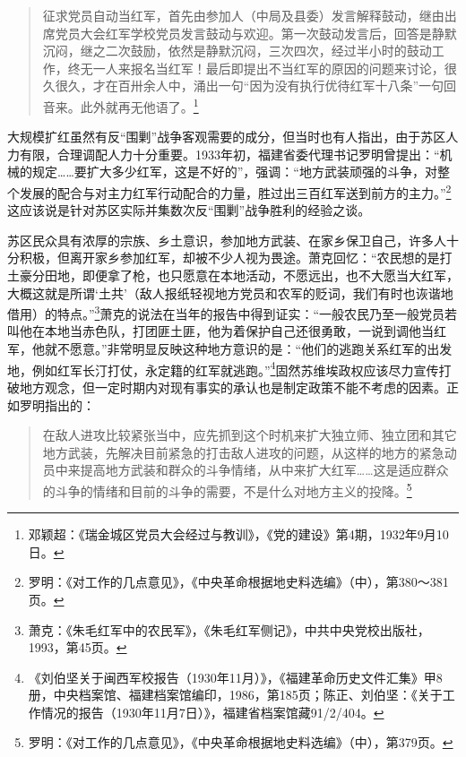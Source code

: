 \begin{quote}

征求党员自动当红军，首先由参加人（中局及县委）发言解释鼓动，继由出席党员大会红军学校党员发言鼓动与欢迎。第一次鼓动发言后，回答是静默沉闷，继之二次鼓励，依然是静默沉闷，三次四次，经过半小时的鼓动工作，终无一人来报名当红军！最后即提出不当红军的原因的问题来讨论，很久很久，才在百卅余人中，涌出一句“因为没有执行优待红军十八条”一句回音来。此外就再无他语了。\footnote{邓颖超：《瑞金城区党员大会经过与教训》，《党的建设》第4期，1932年9月10日。}
\end{quote}


大规模扩红虽然有反“围剿”战争客观需要的成分，但当时也有人指出，由于苏区人力有限，合理调配人力十分重要。1933年初，福建省委代理书记罗明曾提出：“机械的规定……要扩大多少红军，这是不好的”，强调：“地方武装顽强的斗争，对整个发展的配合与对主力红军行动配合的力量，胜过出三百红军送到前方的主力。”\footnote{罗明：《对工作的几点意见》，《中央革命根据地史料选编》（中），第380～381页。}这应该说是针对苏区实际并集数次反“围剿”战争胜利的经验之谈。


苏区民众具有浓厚的宗族、乡土意识，参加地方武装、在家乡保卫自己，许多人十分积极，但离开家乡参加红军，却被不少人视为畏途。萧克回忆：“农民想的是打土豪分田地，即便拿了枪，也只愿意在本地活动，不愿远出，也不大愿当大红军，大概这就是所谓‘土共’（敌人报纸轻视地方党员和农军的贬词，我们有时也诙谐地借用）的特点。”\footnote{萧克：《朱毛红军中的农民军》，《朱毛红军侧记》，中共中央党校出版社，1993，第45页。}萧克的说法在当年的报告中得到证实：“一般农民乃至一般党员若叫他在本地当赤色队，打团匪土匪，他为着保护自己还很勇敢，一说到调他当红军，他就不愿意。”非常明显反映这种地方意识的是：“他们的逃跑关系红军的出发地，例如红军长汀打仗，永定籍的红军就逃跑。”\footnote{《刘伯坚关于闽西军校报告（1930年11月）》，《福建革命历史文件汇集》甲8册，中央档案馆、福建档案馆编印，1986，第185页；陈正、刘伯坚：《关于工作情况的报告（1930年11月7日）》，福建省档案馆藏91/2/404。}固然苏维埃政权应该尽力宣传打破地方观念，但一定时期内对现有事实的承认也是制定政策不能不考虑的因素。正如罗明指出的：

\begin{quote}

在敌人进攻比较紧张当中，应先抓到这个时机来扩大独立师、独立团和其它地方武装，先解决目前紧急的打击敌人进攻的问题，从这样的地方的紧急动员中来提高地方武装和群众的斗争情绪，从中来扩大红军……这是适应群众的斗争的情绪和目前的斗争的需要，不是什么对地方主义的投降。\footnote{罗明：《对工作的几点意见》，《中央革命根据地史料选编》（中），第379页。}
\end{quote}


